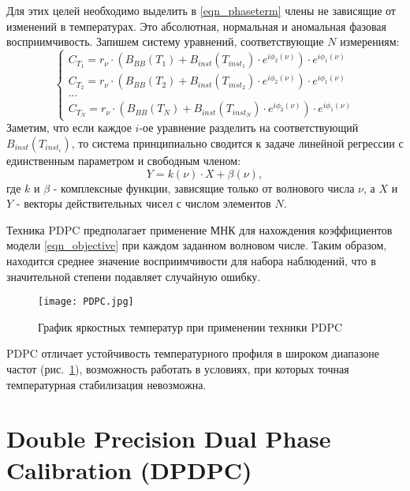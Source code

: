 \documentclass{mipt-thesis-bs}
\begin{document}
	Для этих целей необходимо выделить в \eqref{eqn_phaseterm} члены не зависящие от изменений в температурах. Это абсолютная, нормальная и аномальная фазовая восприимчивость. Запишем систему уравнений, соответствующие $N$ измерениям: 
	\begin{equation}
		\left\{\begin{array}{l}
			C_{T_1}=r_\nu \cdot \left(B_{BB}(T_1)+B_{inst}(T_{inst_1})\cdot e^{i\phi_2(\nu)}\right) \cdot e^{i\phi_1(\nu)}\\
			C_{T_2}=r_\nu \cdot \left(B_{BB}(T_2)+B_{inst}(T_{inst_2})\cdot e^{i\phi_2(\nu)}\right) \cdot e^{i\phi_1(\nu)}\\
			...\\
			C_{T_N}=r_\nu \cdot \left(B_{BB}(T_N)+B_{inst}(T_{inst_N})\cdot e^{i\phi_2(\nu)}\right) \cdot e^{i\phi_1(\nu)}
		\end{array}\right.	
	\end{equation}
	Заметим, что если каждое \(i\)-ое уравнение разделить на соответствующий $B_{inst}(T_{inst_i})$, то система принципиально сводится к задаче линейной регрессии с единственным параметром и свободным членом:
\begin{equation}
	Y=k(\nu) \cdot X + \beta(\nu),
	\label{eqn_objective}
\end{equation}
 где $k$ и $\beta$ - комплексные функции, зависящие только от волнового числа $\nu$, а \(X\) и \(Y\) - векторы действительных чисел с числом элементов \(N\).

	Техника PDPC предполагает применение МНК для нахождения коэффициентов модели \eqref{eqn_objective} при каждом заданном волновом числе. Таким образом, находится среднее значение восприимчивости для набора наблюдений, что в значительной степени подавляет случайную ошибку.
	
	\begin{figure}[h]
		\centering
		\texttt{[image: PDPC.jpg]}
		\caption{График яркостных температур при применении техники PDPC}
		\label{fig_PDCtemps}
	\end{figure}
	
	PDPC отличает устойчивость температурного профиля в широком диапазоне частот (рис.~\ref{fig_PDCtemps}), возможность работать в условиях, при которых точная температурная стабилизация невозможна.
	
	\section{Double Precision Dual Phase Calibration (DPDPC)} \label{sec_DPDPC}
	
\end{document}
